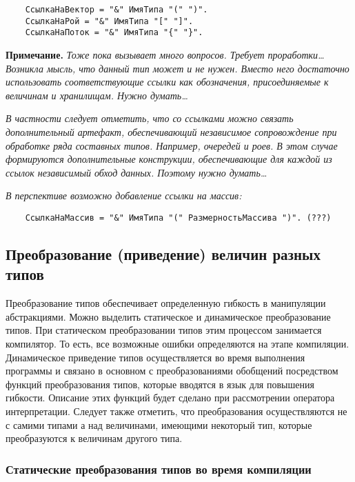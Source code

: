 {\begin{verbatim}
    СсылкаНаВектор = "&" ИмяТипа "(" ")".
    СсылкаНаРой = "&" ИмяТипа "[" "]".
    СсылкаНаПоток = "&" ИмяТипа "{" "}".
\end{verbatim}


\textbf{Примечание.}
\textit{Тоже пока вызывает много вопросов. Требует проработки… Возникла мысль, что данный тип может и не нужен. Вместо него достаточно использовать соответствующие ссылки как обозначения, присоединяемые к величинам и хранилищам. Нужно думать…}

\textit{В частности следует отметить, что со ссылками можно связать дополнительный артефакт, обеспечивающий независимое сопровождение при обработке ряда составных типов. Например, очередей и роев. В этом случае формируются дополнительные конструкции, обеспечивающие для каждой из ссылок независимый обход данных. Поэтому нужно думать…}

\textit{В перспективе возможно добавление ссылки на массив:}

\begin{verbatim}
    СсылкаНаМассив = "&" ИмяТипа "(" РазмерностьМассива ")". (???)
\end{verbatim}

\subsection{Преобразование (приведение) величин разных типов}

Преобразование типов обеспечивает определенную гибкость в манипуляции абстракциями. Можно выделить статическое и динамическое преобразование типов. При статическом преобразовании типов этим процессом занимается компилятор. То есть, все возможные ошибки определяются на этапе компиляции. Динамическое приведение типов осуществляется во время выполнения программы и связано в основном с преобразованиями обобщений посредством функций преобразования типов, которые вводятся в язык для повышения гибкости. Описание этих функций будет сделано при рассмотрении оператора интерпретации. Следует также отметить, что преобразования осуществляются не с самими типами а над величинами, имеющими некоторый тип, которые преобразуются к величинам другого типа.

\subsubsection{Статические преобразования типов во время компиляции}

}
